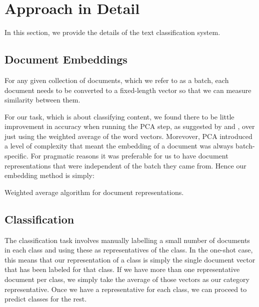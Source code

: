 \documentclass{article} %
\begin{document}
\section{Approach in Detail} \label{approach}
In this section, we provide the details of the text classification system.

\subsection{Document Embeddings}
 For any given collection of documents, which we refer to as a batch, each document needs to be converted to a fixed-length vector so that we can measure similarity between them. 

For our task, which is about classifying content, we found there to be little improvement in accuracy when running the PCA step, as suggested by \citep{arora2017asimple} and \citep{mu2017allbuttop}, over just using the weighted average of the word vectors. Morevover, PCA introduced a level of complexity that meant the embedding of a document was always batch-specific. For pragmatic reasons it was preferable for us to have document representations that were independent of the batch they came from. Hence our embedding method is simply:

\begin{algorithm}[!h]

\caption{Weighted average algorithm for document representations.}
\label{algo:representation}
\end{algorithm}

\subsection{Classification}
The classification task involves manually labelling a small number of documents in each class and using these as representatives of the class. In the one-shot case, this means that our representation of a class is simply the single document vector that has been labeled for that class. If we have more than one representative document per class, we simply take the average of those vectors as our category representative. Once we have a representative for each class, we can proceed to predict classes for the rest.
\end{document}
